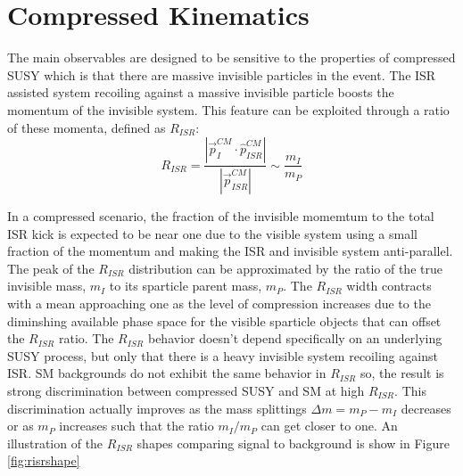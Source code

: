 
\section{Compressed Kinematics}

The main observables are designed to be sensitive to the properties of compressed SUSY which is that there are massive invisible particles in the event. The ISR assisted system recoiling against a massive invisible particle boosts the momentum of the invisible system.  This feature can be exploited through a ratio of these momenta, defined as $R_{ISR}$:
\begin{equation}
R_{ISR} = \frac{|\vec{p}_I^{CM} \cdot \hat{p}_{ISR}^{CM}|}{|\vec{p}_{ISR}^{CM}|} \sim \frac{m_I}{m_P}
\end{equation}

In a compressed scenario, the fraction of the invisible momemtum to the total ISR kick is expected to be near one due to the visible system using a small fraction of the momentum and making the ISR and invisible system anti-parallel. The peak of the $R_{ISR}$ distribution can be approximated by the ratio of the true invisible mass, $m_I$ to its sparticle parent mass, $m_P$.  The $R_{ISR}$  width contracts with a mean approaching one as the level of compression increases due to the diminshing available phase space for the visible sparticle objects that can offset the $R_{ISR}$ ratio. The $R_{ISR}$ behavior doesn't depend specifically on an underlying SUSY process, but only that there is a heavy invisible system recoiling against ISR.  SM backgrounds do not exhibit the same behavior in $R_{ISR}$ so, the result is strong discrimination between compressed SUSY and SM at high $R_{ISR}$.  This discrimination actually improves as the mass splittings $\Delta m = m_P - m_I$ decreases or as $m_P$ increases such that the ratio $m_I/m_P$ can get closer to one. An illustration of the $R_{ISR}$ shapes comparing signal to background is show in Figure \ref{fig:risrshape}

